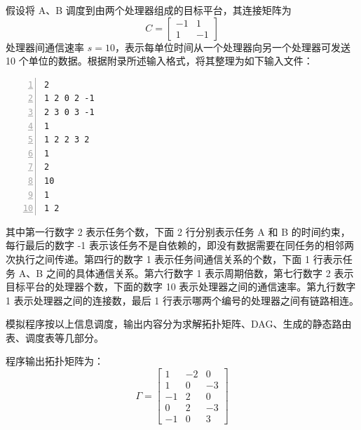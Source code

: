 假设将 A、B 调度到由两个处理器组成的目标平台，其连接矩阵为
$$C=\begin{bmatrix}-1 & 1 \\ 1 & -1\end{bmatrix}$$
处理器间通信速率 $s=10$，表示每单位时间从一个处理器向另一个处理器可发送 10 个单位的数据。根据附录所述输入格式，将其整理为如下输入文件：%
\begin{Verbatim}[numbers=left,frame=single,xleftmargin=50pt,
samepage=true,fontsize=\small,baselinestretch=1.2]
2
1 2 0 2 -1
2 3 0 3 -1
1
1 2 2 3 2
1
2
10
1
1 2
\end{Verbatim}

其中第一行数字 2 表示任务个数，下面 2 行分别表示任务 A 和 B 的时间约束，每行最后的数字 -1 表示该任务不是自依赖的，即没有数据需要在同任务的相邻两次执行之间传递。第四行的数字 1 表示任务间通信关系的个数，下面 1 行表示任务 A、B 之间的具体通信关系。第六行数字 1 表示周期倍数，第七行数字 2 表示目标平台的处理器个数，下面的数字 10 表示处理器之间的通信速率。第九行数字 1 表示处理器之间的连接数，最后 1 行表示哪两个编号的处理器之间有链路相连。

模拟程序按以上信息调度，输出内容分为求解拓扑矩阵、DAG、生成的静态路由表、调度表等几部分。

程序输出拓扑矩阵为：
\begin{equation*}
  \Gamma=\begin{bmatrix}
    1 & -2 & 0 \\
    1 & 0 & -3 \\
    -1 & 2 & 0 \\
    0 & 2 & -3 \\
    -1 & 0 & 3
  \end{bmatrix}
\end{equation*}

